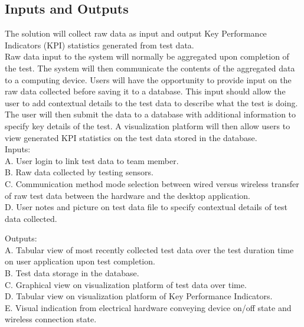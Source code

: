 \documentclass[12pt]{article}
\begin{document}
\subsection{Inputs and Outputs}


The solution will collect raw data as input and output Key Performance Indicators (KPI) statistics generated from test data. \\

Raw data input to the system will normally be aggregated upon completion of the test. The system will then communicate the contents of the aggregated data to a computing device. Users will have the opportunity to provide input on the raw data collected before saving it to a database. This input should allow the user to add contextual details to the test data to describe what the test is doing. The user will then submit the data to a database with additional information to specify key details of the test. A visualization platform will then allow users to view generated KPI statistics on the test data stored in the database. \\

Inputs: \\
A. User login to link test data to team member. \\
B. Raw data collected by testing sensors. \\
C. Communication method mode selection between wired versus wireless transfer of raw test data between the hardware and the desktop application. \\
D. User notes and picture on test data file to specify contextual details of test data collected. 

\newpage

Outputs: \\
A. Tabular view of most recently collected test data over the test duration time on user application upon test completion. \\
B. Test data storage in the database. \\
C. Graphical view on visualization platform of test data over time. \\
D. Tabular view on visualization platform of Key Performance Indicators. \\
E. Visual indication from electrical hardware conveying device on/off state and wireless connection state. 
\end{document}

